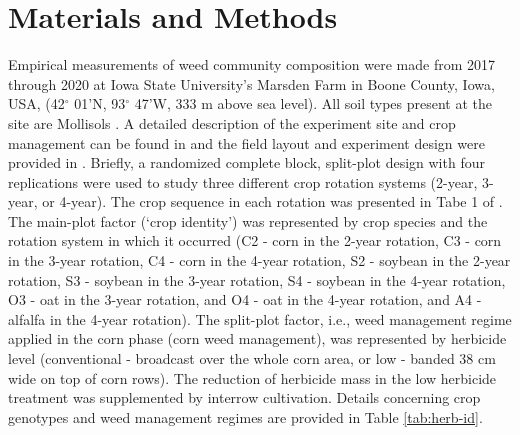 \documentclass[
]{article}
\begin{document}
\hypertarget{materials-and-methods}{%
\section*{Materials and Methods}\label{materials-and-methods}}

Empirical measurements of weed community composition were made from 2017 through 2020 at Iowa State University's Marsden Farm in Boone County, Iowa, USA, (42\(^\circ\) 01'N, 93\(^\circ\) 47'W, 333 m above sea level). All soil types present at the site are Mollisols \citep{chenInfluenceResidueNitrogen2014}. A detailed description of the experiment site and crop management can be found in \citet{liebmanWeedSeedbankDiversity2021} and the field layout and experiment design were provided in \citet{nguyenImpactCroppingSysteminreview}. Briefly, a randomized complete block, split-plot design with four replications were used to study three different crop rotation systems (2-year, 3-year, or 4-year). The crop sequence in each rotation was presented in Tabe 1 of \citet{nguyenImpactCroppingSysteminreview}. The main-plot factor (`crop identity') was represented by crop species and the rotation system in which it occurred (C2 - corn in the 2-year rotation, C3 - corn in the 3-year rotation, C4 - corn in the 4-year rotation, S2 - soybean in the 2-year rotation, S3 - soybean in the 3-year rotation, S4 - soybean in the 4-year rotation, O3 - oat in the 3-year rotation, and O4 - oat in the 4-year rotation, and A4 - alfalfa in the 4-year rotation). The split-plot factor, i.e., weed management regime applied in the corn phase (corn weed management), was represented by herbicide level (conventional - broadcast over the whole corn area, or low - banded 38 cm wide on top of corn rows). The reduction of herbicide mass in the low herbicide treatment was supplemented by interrow cultivation. Details concerning crop genotypes and weed management regimes are provided in Table \ref{tab:herb-id}.
\end{document}
